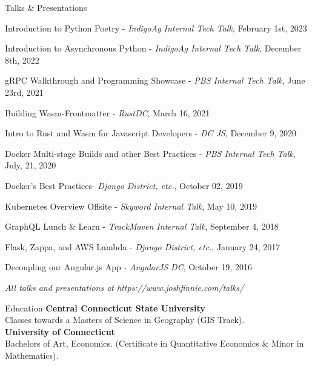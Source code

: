 \documentclass{bluefin_cv}
\begin{document}
\begin{bfcvSection}{Talks \& Presentations}
\begin{bfcvListSubsection}
\item Introduction to Python Poetry - \textsl{IndigoAg Internal Tech Talk}, February 1st, 2023
\item Introduction to Asynchronous Python - \textsl{IndigoAg Internal Tech Talk}, December 8th, 2022
\item gRPC Walkthrough and Programming Showcase - \textsl{PBS Internal Tech Talk}, June 23rd, 2021
\item Building Wasm-Frontmatter - \textsl{RustDC}, March 16, 2021
\item Intro to Rust and Wasm for Javascript Developers - \textsl{DC JS}, December 9, 2020
\item Docker Multi-stage Builds and other Best Practices - \textsl{PBS Internal Tech Talk}, July, 21, 2020
\item Docker's Best Practices- \textsl{Django District, etc.}, October 02, 2019
\item Kubernetes Overview Offsite - \textsl{Skyword Internal Talk}, May 10, 2019
\item GraphQL Lunch \& Learn - \textsl{TrackMaven Internal Talk}, September 4, 2018
\item Flask, Zappa, and AWS Lambda - \textsl{Django District, etc.}, January 24, 2017
\item Decoupling our Angular.js App - \textsl{AngularJS DC}, October 19, 2016
\end{bfcvListSubsection}
\smallskip
\centerline{\textsl{All talks and presentations at https://www.joshfinnie.com/talks/}}
\end{bfcvSection}

\begin{bfcvSection}{Education}
{\bf Central Connecticut State University}
\\ Classes towards a Masters of Science in Geography (GIS Track).\hfill\\
{\bf University of Connecticut}
\\ Bachelors of Art, Economics. (Certificate in Quantitative Economics \& Minor in Mathematics).\hfill\\
\end{bfcvSection}

\end{document}
